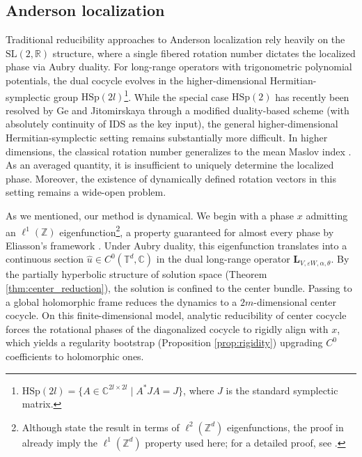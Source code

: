 \documentclass[reqno,11pt]{amsart}
\newcommand{\C}{{\mathbb C}}
\begin{document}
\subsection{Anderson localization}\label{adl}
Traditional reducibility approaches to Anderson localization rely heavily on the $\mathrm{SL}(2,\mathbb{R})$ structure, where a single fibered rotation number  dictates the localized phase via Aubry duality. For long-range operators with trigonometric polynomial potentials, the dual cocycle evolves in the higher-dimensional Hermitian-symplectic group $\mathrm{HSp}(2l)$\footnote{$\mathrm{HSp}(2l) = \{ A \in \mathbb{C}^{2l \times 2l} \mid A^* J A = J \}$, where $J$ is the standard symplectic matrix.}\cite{HaroPuig}. 
While the special case $\mathrm{HSp}(2)$ has recently been resolved by Ge and Jitomirskaya \cite{GJ} through a modified duality-based scheme (with absolutely continuity of IDS as the key input), the general higher-dimensional Hermitian-symplectic setting remains substantially more difficult.
In higher dimensions, the classical rotation number generalizes to the mean Maslov index \cite{LW}. As an averaged quantity, it is insufficient to uniquely determine the localized phase. Moreover, the existence of dynamically defined rotation vectors in this setting remains a wide-open problem. 


As we mentioned, our method is dynamical. 
We begin with a phase $x$ admitting an
$\ell^1(\mathbb Z)$ eigenfunction\footnote{Although \cite{Eli97,E} state the
result in terms of $\ell^2(\mathbb Z^d)$ eigenfunctions, the proof in \cite{Eli97,E} already imply the $\ell^1(\mathbb Z^d)$ property used here; for a
detailed proof, see \cite[Theorem 10.2]{WXZ}.}, a property guaranteed for almost every phase
by Eliasson's framework \cite{Eli97,E}. Under Aubry duality, this eigenfunction
translates into a continuous section
$\widehat u\in C^0(\mathbb T^d,\C)$ in the dual long-range operator
$\mathbf L_{V,\varepsilon W,\alpha,\theta}$.
By the partially hyperbolic structure of solution space (Theorem \ref{thm:center_reduction}), the solution is confined to the center bundle. Passing to a global holomorphic frame reduces the dynamics to a $2m$-dimensional center cocycle. On this finite-dimensional model, analytic reducibility  of center cocycle forces the rotational phases of the diagonalized cocycle to
rigidly align with $x$, which yields a regularity bootstrap (Proposition \ref{prop:rigidity}) upgrading $C^0$ coefficients to holomorphic ones. 
\end{document}
